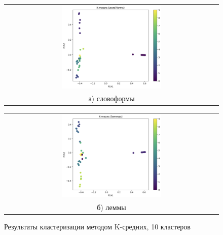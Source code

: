 \begin{figure}
	\begin{tabular}[b]{c}
		\includegraphics[width=0.475\textwidth]{images/9.png} \\
		\small а) словоформы
	\end{tabular}
	\begin{tabular}[b]{c}
		\includegraphics[width=0.475\textwidth]{images/10.png} \\
		\small б) леммы
	\end{tabular}
	\caption{Результаты кластеризации методом K-средних, 10 кластеров}
	\label{img:5}
\end{figure}

